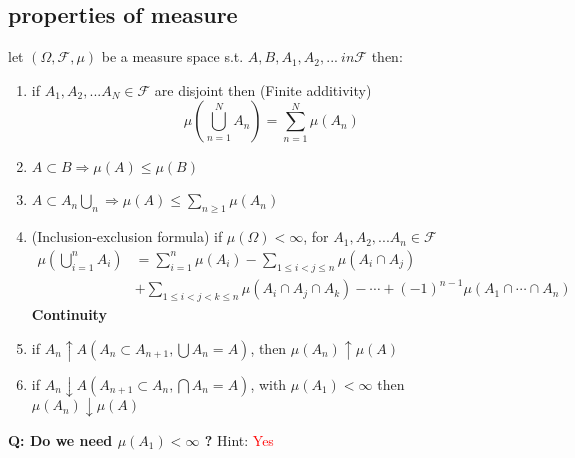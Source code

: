 \subsection{properties of measure}
let $(\Omega, \mathcal{F}, \mu)$ be a measure space s.t. $A, B, A_1, A_2, ...\ in\mathcal{F}$ then:
\begin{enumerate}
    \item if $A_1, A_2, ... A_N\in \mathcal{F}$ are disjoint then \quad (Finite additivity)
    \begin{equation*}
        \mu(\bigcup\limits_{n=1}^{N}A_n) = \sum\limits_{n=1}^{N}\mu(A_n)
    \end{equation*}
    \item $A\subset B \Rightarrow \mu(A) \leq \mu(B)$
    \item $A \subset A_n \bigcup\limits_{n} \Rightarrow \mu(A) \leq \sum\limits_{n \geq 1}\mu(A_n)$
    \item (Inclusion-exclusion formula) if $\mu(\Omega) < \infty$, for $A_1, A_2, ... A_n\in \mathcal{F}$
    \begin{align*}
         \mu(\bigcup_{i=1}^{n} A_{i})&=\sum_{i=1}^{n}\mu(A_{i})-\sum_{1 \leq i<j \leq n}\mu(A_{i} \cap A_{j}) \\
         &+\sum_{1 \leq i<j<k \leq n}\mu(A_{i} \cap A_{j} \cap A_{k})-\cdots+(-1)^{n-1}\mu(A_{1} \cap \cdots \cap A_{n})
    \end{align*}
    \newpage
    \textbf{Continuity}
    \item if $A_n \uparrow A (A_n \subset A_{n+1}, \bigcup A_n = A)$, then $\mu(A_n) \uparrow \mu(A)$
    \item if $A_n \downarrow A (A_{n+1} \subset A_n, \bigcap A_n = A)$, with $\mu(A_1) < \infty$ then $\mu(A_n) \downarrow \mu(A)$
\end{enumerate}
\textbf{Q: Do we need $\mu(A_1) < \infty$ ?} Hint: \textcolor{red}{Yes}
